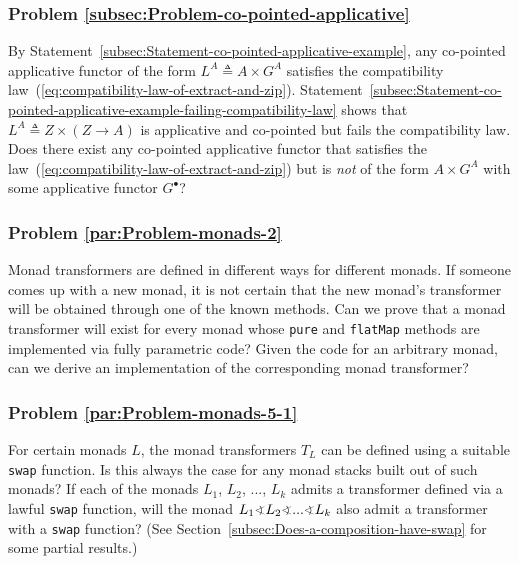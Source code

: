 \subsubsection{Problem \label{subsec:Problem-co-pointed-applicative}\ref{subsec:Problem-co-pointed-applicative}}

By Statement~\ref{subsec:Statement-co-pointed-applicative-example},
any co-pointed applicative functor of the form $L^{A}\triangleq A\times G^{A}$
satisfies the compatibility law~(\ref{eq:compatibility-law-of-extract-and-zip}).
Statement~\ref{subsec:Statement-co-pointed-applicative-example-failing-compatibility-law}
shows that $L^{A}\triangleq Z\times\left(Z\rightarrow A\right)$ is
applicative and co-pointed but fails the compatibility law. Does there
exist any co-pointed applicative functor that satisfies the law~(\ref{eq:compatibility-law-of-extract-and-zip})
but is \emph{not} of the form $A\times G^{A}$ with some applicative
functor $G^{\bullet}$? 

\subsubsection{Problem \label{par:Problem-monads-2}\ref{par:Problem-monads-2}}

Monad transformers are defined in different ways for different monads.
If someone comes up with a new monad, it is not certain that the new
monad\textsf{'}s transformer will be obtained through one of the known methods.
Can we prove that a monad transformer will exist for every monad whose
\lstinline!pure! and \lstinline!flatMap! methods are implemented
via fully parametric code? Given the code for an arbitrary monad,
can we derive an implementation of the corresponding monad transformer?

\subsubsection{Problem \label{par:Problem-monads-5-1}\ref{par:Problem-monads-5-1}}

For certain monads $L$, the monad transformers $T_{L}$ can be defined
using a suitable \lstinline!swap! function. Is this always the case
for any monad stacks built out of such monads? If each of the monads
$L_{1}$, $L_{2}$, ..., $L_{k}$ admits a transformer defined via
a lawful \lstinline!swap! function, will the monad $L_{1}\varangle L_{2}\varangle...\varangle L_{k}$
also admit a transformer with a \lstinline!swap! function? (See Section~\ref{subsec:Does-a-composition-have-swap}
for some partial results.)

